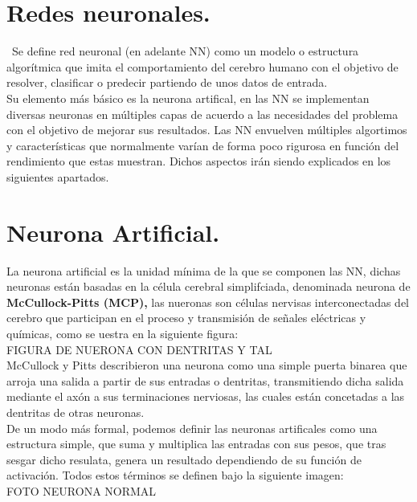 \documentclass[a4paper,10pt]{article}
\begin{document}
\section{Redes neuronales.}
\
Se define red neuronal (en adelante NN) como un modelo o estructura algorítmica que imita el comportamiento del cerebro humano con el objetivo de resolver, clasificar o predecir partiendo de unos datos de entrada.\\
Su elemento más básico es la neurona artifical, en las NN se implementan diversas neuronas en múltiples capas de acuerdo a las necesidades del problema con el objetivo de mejorar sus resultados.
Las NN envuelven múltiples algortimos y características que normalmente varían de forma poco rigurosa en función del rendimiento que estas muestran. Dichos aspectos irán siendo  explicados en los siguientes apartados.
\section{Neurona Artificial.}
La neurona artificial es la unidad mínima de la que se componen las NN, dichas neuronas están basadas en la célula cerebral simplifciada, denominada neurona de \textbf{McCullock-Pitts (MCP),} las nueronas son células nervisas interconectadas del cerebro que participan en el proceso y transmisión de señales eléctricas y químicas, como se uestra en la siguiente figura: \\
FIGURA DE NUERONA CON DENTRITAS Y TAL\\
McCullock y Pitts describieron una neurona como una simple puerta binarea que arroja una salida a partir de sus entradas o dentritas, transmitiendo dicha salida mediante el axón a sus terminaciones nerviosas, las cuales están concetadas a las dentritas de otras neuronas.\\
De un modo más formal, podemos definir las neuronas artificales como una estructura simple, que suma y multiplica las entradas con sus pesos, que tras sesgar dicho resulata, genera un resultado dependiendo de su función de activación. Todos estos términos se definen bajo la siguiente imagen:
\\FOTO NEURONA NORMAL
\end{document}
